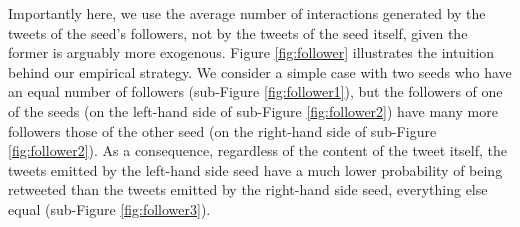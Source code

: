 Importantly here, we use the average number of interactions generated by the tweets of the seed's followers, not by the tweets of the seed itself, given the former is arguably more exogenous. Figure \ref{fig:follower} illustrates the intuition behind our empirical strategy. We consider a simple case with two seeds who have an equal number of followers (sub-Figure \ref{fig:follower1}), but the followers of one of the seeds (on the left-hand side of sub-Figure \ref{fig:follower2}) have many more followers those of the other seed (on the right-hand side of sub-Figure \ref{fig:follower2}). As a consequence, regardless of the content of the tweet itself, the tweets emitted by the left-hand side seed have a much lower probability of being retweeted than the tweets emitted by the right-hand side seed, everything else equal (sub-Figure \ref{fig:follower3}).


